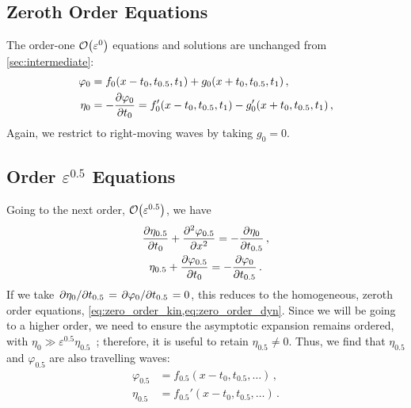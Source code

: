 \documentclass{jfm}
\let\Oldsubsection\subsection
\renewcommand{\subsection}{\FloatBarrier\Oldsubsection}
\renewcommand*{\epsilon}{\varepsilon}
\begin{document}
\subsection{Zeroth Order Equations}
The order-one $\order{\epsilon^0}$ equations and solutions are unchanged
from \cref{sec:intermediate}:
\begin{align}
  \varphi_0 &= f_0(x-t_0,t_{0.5},t_1) + g_0(x+t_0,t_{0.5},t_1) \,, \\
  \eta_0 &= - \pdv{\varphi_0}{t_0} = f_0'(x-t_0,t_{0.5},t_1) -
    g_0'(x+t_0,t_{0.5},t_1) \,,
\end{align}
Again, we restrict to right-moving waves by taking $g_0=0$.

\subsection{Order \texorpdfstring{$\epsilon^{0.5}$}{0.5} Equations}
Going to the next order, $\order{\epsilon^{0.5}}$, we have
\begin{gather}
  \pdv{\eta_{0.5}}{t_0} + \pdv[2]{\varphi_{0.5}}{x} =
  -\pdv{\eta_0}{t_{0.5}} \,, \\
  \eta_{0.5} + \pdv{\varphi_{0.5}}{t_0} = -\pdv{\varphi_0}{t_{0.5}}\,.
\end{gather}
If we take $\pdv*{\eta_0}{t_{0.5}} = \pdv*{\varphi_0}{t_{0.5}} = 0$,
this reduces to the homogeneous, zeroth order equations,
\cref{eq:zero_order_kin,eq:zero_order_dyn}.
Since we will be going to a higher order, we need to ensure the
asymptotic expansion remains ordered, with $\eta_0 \gg \epsilon^{0.5}
\eta_{0.5}$~\citep{ott1969nonlinear}; therefore, it is useful to
retain $\eta_{0.5} \neq 0$.
Thus, we find that $\eta_{0.5}$ and $\varphi_{0.5}$ are also travelling
waves:
\begin{align}
  \varphi_{0.5} &= f_{0.5}(x-t_0,t_{0.5},\ldots) \,,
    \label{eq:phi0.5_sol} \\
  \eta_{0.5} &= f_{0.5}'(x-t_0,t_{0.5},\ldots) \,.
    \label{eq:eta0.5_sol}
\end{align}
\end{document}
